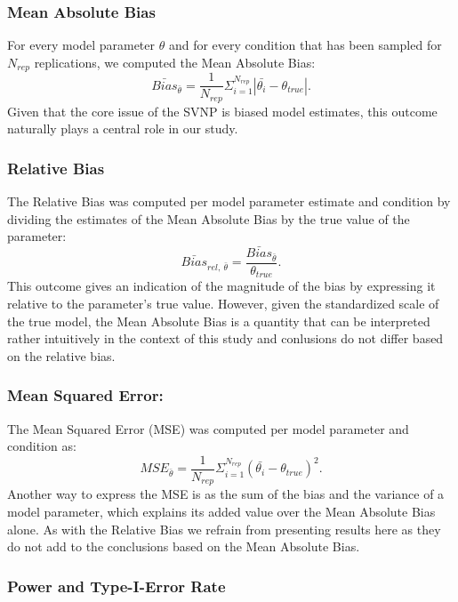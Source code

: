 \documentclass[
  man, donotrepeattitle,floatsintext]{apa6}
\begin{document}
\hypertarget{mean-absolute-bias}{%
\subsubsection{Mean Absolute Bias}\label{mean-absolute-bias}}

For every model parameter \(\theta\) and for every condition that has been sampled for \(N_{rep}\) replications, we computed the Mean Absolute Bias:
\[\bar{Bias}_{\bar{\theta}} = \frac{1}{N_{rep}} \Sigma_{i = 1}^{N_{rep}} |\bar{\theta_i} - \theta_{true}|.\]
Given that the core issue of the SVNP is biased model estimates, this outcome naturally plays a central role in our study.

\hypertarget{relative-bias}{%
\subsubsection{Relative Bias}\label{relative-bias}}

The Relative Bias was computed per model parameter estimate and condition by dividing the estimates of the Mean Absolute Bias by the true value of the parameter:
\[\bar{Bias}_{rel, \ \bar{\theta} } = \frac{\bar{Bias}_{\bar{\theta}}}{\theta_{true} }.\]
This outcome gives an indication of the magnitude of the bias by expressing it relative to the parameter's true value. However, given the standardized scale of the true model, the Mean Absolute Bias is a quantity that can be interpreted rather intuitively in the context of this study and conlusions do not differ based on the relative bias.

\hypertarget{mean-squared-error}{%
\subsubsection{Mean Squared Error:}\label{mean-squared-error}}

The Mean Squared Error (MSE) was computed per model parameter and condition as:
\[MSE_{\bar{\theta}} = \frac{1}{N_{rep}} \Sigma_{i = 1}^{N_{rep}} (\bar{\theta_i} - \theta_{true})^2.\]
Another way to express the MSE is as the sum of the bias and the variance of a model parameter, which explains its added value over the Mean Absolute Bias alone. As with the Relative Bias we refrain from presenting results here as they do not add to the conclusions based on the Mean Absolute Bias.

\hypertarget{power-and-type-i-error-rate}{%
\subsubsection{Power and Type-I-Error Rate}\label{power-and-type-i-error-rate}}
\end{document}
